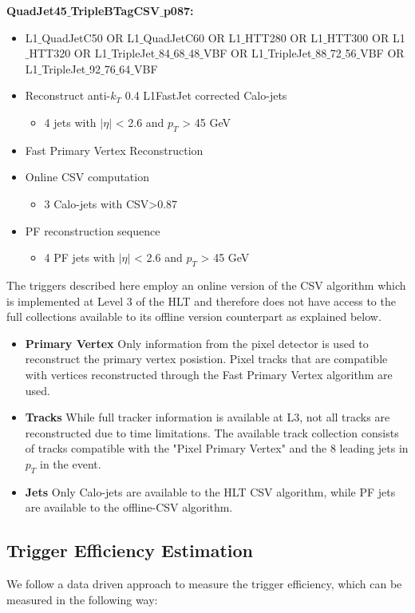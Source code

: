 \textbf{QuadJet45$\_$TripleBTagCSV$\_$p087:}
\begin{itemize}
	\item L1$\_$QuadJetC50 OR L1$\_$QuadJetC60 OR L1$\_$HTT280 OR L1$\_$HTT300 OR L1$\_$HTT320 OR L1$\_$TripleJet$\_$84$\_$68$\_$48$\_$VBF OR L1$\_$TripleJet$\_$88$\_$72$\_$56$\_$VBF OR L1$\_$TripleJet$\_$92$\_$76$\_$64$\_$VBF
	\item Reconstruct anti-$k_{T}$ 0.4 L1FastJet corrected Calo-jets
	\begin{itemize}
		\item 4 jets with $|\eta|$ < 2.6 and $p_{T}$ > 45 GeV		
	\end{itemize}
	\item Fast Primary Vertex Reconstruction
	\item Online CSV computation
	\begin{itemize}
		\item 3 Calo-jets with CSV>0.87
	\end{itemize}
	\item PF reconstruction sequence
	\begin{itemize}
		\item 4 PF jets with $|\eta|$ < 2.6 and $p_{T}$ > 45 GeV		
	\end{itemize}
\end{itemize}

The triggers described here employ an online version of the CSV algorithm which is implemented at Level 3 of the HLT and therefore does not have access to the full collections available to its offline version counterpart as explained below.

\begin{itemize}
	\item \textbf{Primary Vertex} Only information from the pixel detector is used to reconstruct the primary vertex posistion. Pixel tracks that are compatible with vertices reconstructed through the Fast Primary Vertex algorithm are used.
	\item \textbf{Tracks} While full tracker information is available at L3, not all tracks are reconstructed due to time limitations. The available track collection consists of tracks compatible with the "Pixel Primary Vertex" and the 8 leading jets in $p_{T}$ in the event.
	\item \textbf{Jets} Only Calo-jets are available to the HLT CSV algorithm, while PF jets are available to the offline-CSV algorithm.
\end{itemize}

\subsection{Trigger Efficiency Estimation}
We follow a data driven approach to measure the trigger efficiency, which can be measured in the following way:

